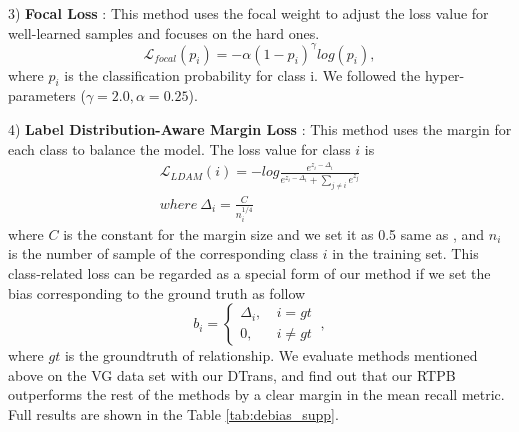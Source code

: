 3) \textbf{Focal Loss} \cite{Lin_2017_ICCV}: This method uses the focal weight to adjust the loss value for well-learned samples and focuses on the hard ones.
\begin{equation}
	\mathcal{L}_{focal}(p_i) = -\alpha(1-p_i)^\gamma log(p_i),
\end{equation}
where $p_i$ is the classification probability for class i. We followed the hyper-parameters ($\gamma = 2.0, \alpha= 0.25$). 

4) \textbf{Label Distribution-Aware Margin Loss} \cite{cao2019learning}: This method uses the margin for each class to balance the model. The loss value for class $i$ is
\begin{equation}
	\begin{split}
		\mathcal{L}_{LDAM}(i) = -log \frac{e^{z_i - \Delta_i}}{e^{z_i - \Delta_i} + \sum_{j\neq i}{e^{z_j}}} \\
		where ~ \Delta_i = \frac{C}{n_i^{1/4}}
	\end{split}
\end{equation}
where $C$ is the constant for the margin size and we set it as 0.5 same as \cite{cao2019learning}, and  $n_i$ is the number of sample of the corresponding class $i$ in the training set. This class-related loss can be regarded as a special form of our method if we set the bias corresponding to the ground truth as follow
\begin{equation}
	b_i =\left\{
	\begin{aligned}
		\Delta_i, ~ & i = gt   \\
		0, ~        & i\neq gt
	\end{aligned}
	\right.
	~,
\end{equation}
where $gt$ is the groundtruth of relationship.
We evaluate methods mentioned above on the VG data set\cite{krishna2016visual} with our DTrans, and find out that our RTPB outperforms the rest of the methods by a clear margin in the mean recall metric. Full results are shown in the Table \ref{tab:debias_supp}.

